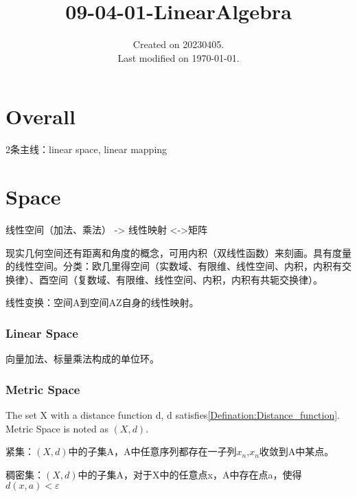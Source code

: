 \documentclass[UTF8]{../../09-Mathematics}
\begin{document}
\title{09-04-01-LinearAlgebra}
\date{Created on 20230405.\\   Last modified on \today.}
\maketitle
\tableofcontents


\chapter{Overall}



2条主线：linear space, linear mapping





\chapter{Space}




线性空间（加法、乘法） -> 线性映射 <->矩阵

现实几何空间还有距离和角度的概念，可用内积（双线性函数）来刻画。具有度量的线性空间。分类：欧几里得空间（实数域、有限维、线性空间、内积，内积有交换律）、酉空间（复数域、有限维、线性空间、内积，内积有共轭交换律）。

线性变换：空间A到空间AZ自身的线性映射。

\subsection{Linear Space}

向量加法、标量乘法构成的单位环。


\subsection{Metric Space}

\begin{definition}
    The set X with a distance function d, d satisfies\ref{Defination:Distance_function}. Metric Space is noted as $(X,d)$.
\end{definition}

\begin{definition}
    紧集：$(X,d)$中的子集A，A中任意序列都存在一子列$x_n$,$x_n$收敛到A中某点。
\end{definition}

\begin{definition}
    稠密集：$(X,d)$中的子集A，对于X中的任意点x，A中存在点a，使得$d(x,a)< \varepsilon $
\end{definition}
\end{document}

